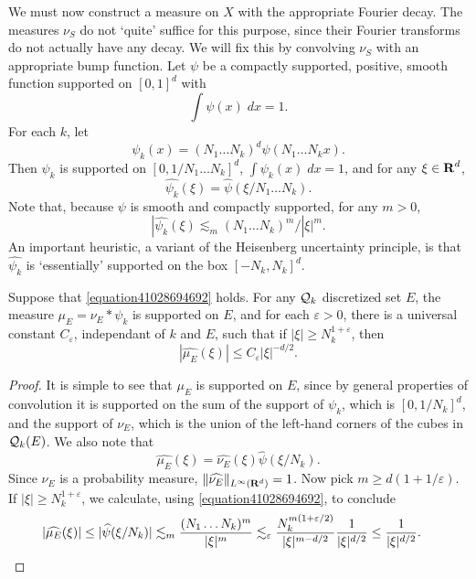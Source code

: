 We must now construct a measure on $X$ with the appropriate Fourier decay. The measures $\nu_S$ do not `quite' suffice for this purpose, since their Fourier transforms do not actually have any decay. We will fix this by convolving $\nu_S$ with an appropriate bump function. Let $\psi$ be a compactly supported, positive, smooth function supported on $[0,1]^d$ with
%
\[ \int \psi(x)\; dx = 1. \]
%
For each $k$, let
%
\[ \psi_k(x) = (N_1 \dots N_k)^d \psi(N_1 \dots N_k x). \]
%
Then $\psi_k$ is supported on $[0,1/N_1 \dots N_k]^d$, $\int \psi_k(x)\; dx = 1$, and for any $\xi \in \operatorname{\mathbf{R}}^d$,
%
\[ \widehat{\psi_k}(\xi) = \widehat{\psi}(\xi/N_1 \dots N_k). \]
%
Note that, because $\psi$ is smooth and compactly supported, for any $m > 0$,
%
\[ |\widehat{\psi_k}(\xi) \lesssim_m (N_1 \dots N_k)^m / |\xi|^m. \]
%
An important heuristic, a variant of the Heisenberg uncertainty principle, is that $\widehat{\psi_k}$ is `essentially' supported on the box $[-N_k,N_k]^d$.

\begin{lemma} \label{lemma09679009341}
    Suppose that \eqref{equation41028694692} holds. For any $\operatorname{\mathcal{Q}}_k$ discretized set $E$, the measure $\mu_E = \nu_E * \psi_k$ is supported on $E$, and for each $\varepsilon > 0$, there is a universal constant $C_\varepsilon$, independant of $k$ and $E$, such that if $|\xi| \geq N_k^{1 + \varepsilon}$, then
    \[ |\widehat{\mu_E}(\xi)| \leq C_\varepsilon |\xi|^{-d/2}. \]
\end{lemma}
\begin{proof}
    It is simple to see that $\mu_E$ is supported on $E$, since by general properties of convolution it is supported on the sum of the support of $\psi_k$, which is $[0,1/N_k]^d$, and the support of $\nu_E$, which is the union of the left-hand corners of the cubes in $\operatorname{\mathcal{Q}}_k(E)$. We also note that
    \[ \widehat{\mu_E}(\xi) = \widehat{\nu_E}(\xi) \widehat{\psi}(\xi/N_k). \]
    Since $\nu_E$ is a probability measure, $\| \widehat{\nu_E} \|_{L^\infty(\operatorname{\mathbf{R}}^d)} = 1$. Now pick $m \geq d(1 + 1/\varepsilon)$. If $|\xi| \geq N_k^{1 + \varepsilon}$, we calculate, using \eqref{equation41028694692}, to conclude
    \begin{align*}
        |\widehat{\mu_E}(\xi)| &\leq |\widehat{\psi}(\xi/N_k)| \lesssim_m \frac{(N_1 \dots N_k)^m}{|\xi|^m} \lesssim_\varepsilon \frac{N_k^{m(1 + \varepsilon/2)}}{|\xi|^{m - d/2}} \frac{1}{|\xi|^{d/2}} \leq \frac{1}{|\xi|^{d/2}}. \qedhere
    \end{align*}
\end{proof}

